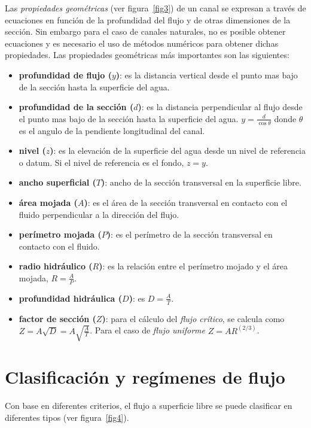 \documentclass[11pt, oneside]{article}
\begin{document}
Las \emph{propiedades geom\'etricas} (ver figura~\ref{fig3}) de un canal se expresan a través de ecuaciones en funci\'on de la profundidad del flujo y de otras dimensiones de la secci\'on. Sin embargo para el caso de canales naturales, no es posible obtener ecuaciones y es necesario el uso de m\'etodos num\'ericos para obtener dichas propiedades. Las propiedades geom\'etricas m\'as importantes son las siguientes:
\begin{itemize}
\item \textbf{profundidad de flujo ($y$)}: es la distancia vertical desde el punto mas bajo de la secci\'on hasta la superficie del agua. 
\item \textbf{profundidad de la secci\'on ($d$)}: es la distancia perpendicular al flujo desde el punto mas bajo de la sección hasta la superficie del agua. $y=\frac{d}{\cos \theta}$ donde $\theta$ es el angulo de la pendiente longitudinal del canal. 
\item \textbf{nivel ($z$)}: es la elevaci\'on de la superficie del agua desde un nivel de referencia o datum. Si el nivel de referencia es el fondo, $z=y$.
\item  \textbf{ancho superficial ($T$)}: ancho de la secci\'on transversal en la superficie libre. 
\item  \textbf{\'area mojada ($A$)}: es el \'area de la secci\'on transversal en contacto con el fluido perpendicular a la direcci\'on del flujo. 
\item  \textbf{perímetro mojada ($P$)}: es el per\'imetro de la secci\'on transversal en contacto con el fluido.
\item  \textbf{radio hidr\'aulico ($R$)}: es la relaci\'on entre el per\'imetro mojado y el \'area mojada, $R=\frac{A}{P}$.
\item  \textbf{profundidad hidr\'aulica ($D$)}: es  $D=\frac{A}{T}$.
\item  \textbf{factor de secci\'on ($Z$)}: para el c\'alculo del \emph{flujo cr\'itico}, se calcula como $Z= A\sqrt{D} = A \sqrt{\frac{A}{T}}$. Para el caso de \emph{flujo uniforme} $Z=AR^{(2/3)}$.
\end{itemize}

\section{Clasificaci\'on y reg\'imenes de flujo} %
Con base en diferentes criterios, el flujo a superficie libre se puede clasificar en diferentes tipos (ver figura~\ref{fig4}).
\end{document}
